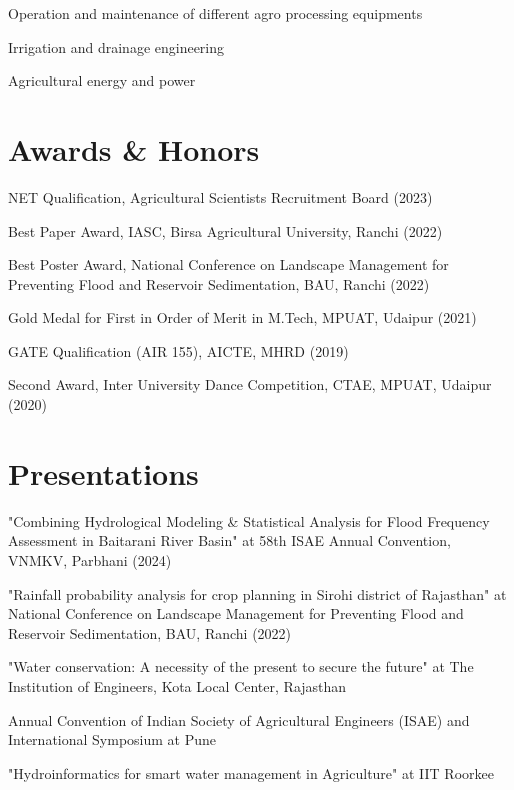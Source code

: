 \documentclass[]{deedy-resume-openfont}
\begin{document}
\begin{minipage}[t]{0.66\textwidth}
\begin{tightemize}
\item Operation and maintenance of different agro processing equipments
\item Irrigation and drainage engineering
\item Agricultural energy and power
\end{tightemize}
\sectionsep

\section{Awards \& Honors}
\begin{tightemize}
\item NET Qualification, Agricultural Scientists Recruitment Board (2023)
\item Best Paper Award, IASC, Birsa Agricultural University, Ranchi (2022)
\item Best Poster Award, National Conference on Landscape Management for Preventing Flood and Reservoir Sedimentation, BAU, Ranchi (2022)
\item Gold Medal for First in Order of Merit in M.Tech, MPUAT, Udaipur (2021)
\item GATE Qualification (AIR 155), AICTE, MHRD (2019)
\item Second Award, Inter University Dance Competition, CTAE, MPUAT, Udaipur (2020)
\end{tightemize}
\sectionsep

\section{Presentations}
\begin{tightemize}
\item "Combining Hydrological Modeling \& Statistical Analysis for Flood Frequency Assessment in Baitarani River Basin" at 58th ISAE Annual Convention, VNMKV, Parbhani (2024)
\item "Rainfall probability analysis for crop planning in Sirohi district of Rajasthan" at National Conference on Landscape Management for Preventing Flood and Reservoir Sedimentation, BAU, Ranchi (2022)
\item "Water conservation: A necessity of the present to secure the future" at The Institution of Engineers, Kota Local Center, Rajasthan
\item Annual Convention of Indian Society of Agricultural Engineers (ISAE) and International Symposium at Pune
\item "Hydroinformatics for smart water management in Agriculture" at IIT Roorkee
\end{tightemize}
\sectionsep


\end{minipage}
\end{document}
